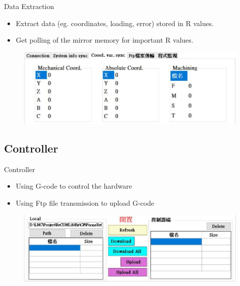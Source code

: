\documentclass[11pt]{beamer}
\begin{document}
\begin{frame}{Data Extraction}
  \begin{itemize}
    \item Extract data (eg. coordinates, loading, error) stored in R values.
    \item Get polling of the mirror memory for important R values.
  \end{itemize}
  \begin{figure}
    \centering
    \includegraphics[scale=0.3]{ui2.jpg}
  \end{figure}
  
  \end{frame}


\subsection{Controller}
\begin{frame}{Controller}
  \begin{itemize}
    \item Using G-code to control the hardware
    \item Using Ftp file transmission to upload G-code 
  \end{itemize}
  \begin{figure}
    \includegraphics[scale=0.3]{ui.jpg}
  \end{figure}
\end{frame}
\end{document}
